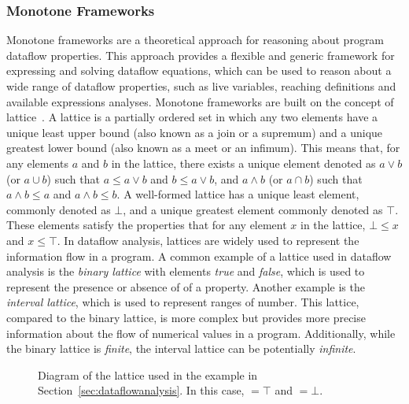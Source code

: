 \subsubsection*{Monotone Frameworks}
\label{sec:monotoneframeworks}
Monotone frameworks are a theoretical approach for reasoning
about program dataflow properties.
This approach provides a flexible and generic framework for expressing and solving
dataflow equations, which can be used to reason about a wide range of dataflow
properties, such as live variables, reaching definitions and available expressions analyses.
Monotone frameworks are built on the concept of lattice~\cite{Donnellan1968}.
A lattice is a partially ordered set in which any two elements have a unique least
upper bound (also known as a join or a supremum) and a unique greatest lower bound
(also known as a meet or an infimum). This means that, for any elements $a$ and $b$ in
the lattice, there exists a unique element denoted as  $a \vee b$  (or  $a \cup b$)
such that  $a \leq a \vee b$  and  $ b \leq a \vee b$, and  $a \wedge b$
(or  $ a\cap b$) such that  $ a\wedge b\leq a$  and  $a \wedge b\leq b$.
A well-formed lattice has a unique least element, commonly denoted as $\bot$,
and a unique greatest element commonly denoted as $\top$. These elements satisfy
the properties that for any element $x$ in the lattice, $\bot \leq x$ and $x \leq \top$.
In dataflow analysis, lattices are widely used to represent the information flow in a program.
A common example of a lattice used in dataflow analysis is the \emph{binary lattice} with
elements \emph{true} and \emph{false}, which is used to represent the presence or absence of
of a property. Another example is the \emph{interval lattice}, which is used
to represent ranges of number. This lattice, compared to the binary lattice, is more
complex but provides more precise information about the flow of numerical values
in a program. Additionally, while the binary lattice is \emph{finite}, the interval lattice can
be potentially \emph{infinite}.
\begin{figure}
     \begin{center}
    \caption{\label{fig:lattice}Diagram of the lattice used in the example in Section~\ref{sec:dataflowanalysis}.
    In this case,  $= \top$ and $= \bot$.}
  \end{center}
\end{figure}


